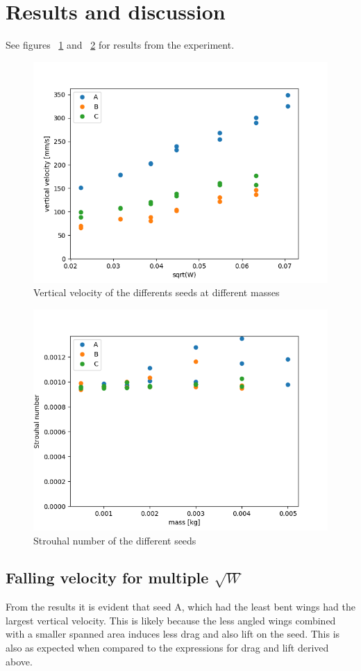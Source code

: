 \documentclass[aps,reprint]{revtex4-1}
\begin{document}
\section{Results and discussion}
\label{sec:results}
See figures ~\ref{fig:oppg1} and ~\ref{fig:oppg2} for results from the
experiment.
\begin{figure}
  \includegraphics[width=0.8\linewidth]{oppg1.png}
  \caption{
    \label{fig:oppg1}
    Vertical velocity of the differents seeds at different masses
  }
\end{figure}
\begin{figure}
  \includegraphics[width=0.8\linewidth]{oppg2.png}
  \caption{
    \label{fig:oppg2}
    Strouhal number of the different seeds
  }
\end{figure}
\subsection{Falling velocity for multiple $\sqrt{W}$}
From the results it is evident that seed A, which had the least bent wings
had the largest vertical velocity. This is likely because the less angled wings
combined with a smaller spanned area induces less drag and also lift on the
seed. This is also as expected when compared to the expressions for drag and lift
derived above.
\end{document}
